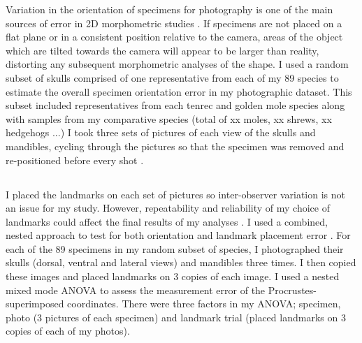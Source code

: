 
	Variation in the orientation of specimens for photography is one of the main sources of error in 2D morphometric studies \citep{Adriaens2007}. If specimens are not placed on a flat plane or in a consistent position relative to the camera, areas of the object which are tilted towards the camera will appear to be larger than reality, distorting any subsequent morphometric analyses of the shape. 
	I used a random subset of skulls comprised of one representative from each of my 89 species %
	to estimate the overall specimen orientation error in my photographic dataset. This subset included representatives from each tenrec and golden mole species along with samples from my comparative species (total of xx moles, xx shrews, xx hedgehogs ...)  I took three sets of pictures of each view of the skulls and mandibles, cycling through the pictures so that the specimen was removed and re-positioned before every shot \citep{Viscosi2011}. 

\subsection{}

	I placed the landmarks on each set of pictures so inter-observer variation is not an issue for my study.  However, repeatability and reliability of my choice of landmarks could affect the final results of my analyses \citep{Arnqvist1998}.
	I used a combined, nested approach to test for both orientation and landmark placement error \citep{Arnqvist1998, Barrow2008}. For each of the 89 specimens in my random subset of species, I photographed their skulls (dorsal, ventral and lateral views) and mandibles three times. I then copied these images and placed landmarks on 3 copies of each image. I used a nested mixed mode ANOVA to assess the measurement error of the Procrustes-superimposed coordinates. There were three factors in my ANOVA; specimen, photo (3 pictures of each specimen) and landmark trial (placed landmarks on 3 copies of each of my photos).











